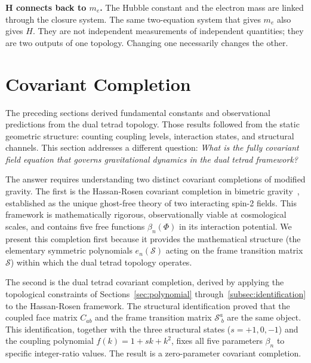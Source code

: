 \documentclass[aps,prd,preprint,superscriptaddress,showpacs,preprintnumbers,amsmath,amssymb,nofootinbib]{revtex4-2}
\begin{document}
\textbf{H connects back to $m_e$.} The Hubble constant and the electron mass are linked through the closure system. The same two-equation system that gives $m_e$ also gives $H$. They are not independent measurements of independent quantities; they are two outputs of one topology. Changing one necessarily changes the other.

\section{Covariant Completion}
\label{sec:covariant}

The preceding sections derived fundamental constants and observational predictions from the dual tetrad topology. Those results followed from the static geometric structure: counting coupling levels, interaction states, and structural channels. This section addresses a different question: \emph{What is the fully covariant field equation that governs gravitational dynamics in the dual tetrad framework?}

The answer requires understanding two distinct covariant completions of modified gravity. The first is the Hassan-Rosen covariant completion in bimetric gravity~\cite{hassan2012}, established as the unique ghost-free theory of two interacting spin-2 fields. This framework is mathematically rigorous, observationally viable at cosmological scales, and contains five free functions $\beta_n(\Phi)$ in its interaction potential. We present this completion first because it provides the mathematical structure (the elementary symmetric polynomials $e_n(\mathcal{S})$ acting on the frame transition matrix $\mathcal{S}$) within which the dual tetrad topology operates.

The second is the dual tetrad covariant completion, derived by applying the topological constraints of Sections~\ref{sec:polynomial} through~\ref{subsec:identification} to the Hassan-Rosen framework. The structural identification proved that the coupled face matrix $C_{ab}$ and the frame transition matrix $\mathcal{S}^a_{\;b}$ are the same object. This identification, together with the three structural states ($s = +1, 0, -1$) and the coupling polynomial $f(k) = 1 + sk + k^2$, fixes all five parameters $\beta_n$ to specific integer-ratio values. The result is a zero-parameter covariant completion.
\end{document}

